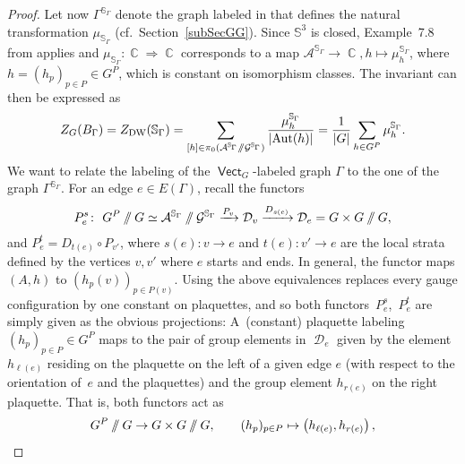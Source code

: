\documentclass[pdftex]{sigma}
\DeclareMathOperator{\Aut}{Aut}
\DeclareMathOperator{\vect}{\mathsf{Vect}}
\DeclareMathOperator{\C}{\mathbb{C}}
\DeclareMathOperator{\cald}{\mathcal{D}}
\newcommand{\sslash}{\mathbin{/\mkern-6mu/}}
\numberwithin{equation}{section}
\theoremstyle{definition}
\begin{document}
\begin{proof}
Let now $\Gamma^{\mathbb{S}_{\Gamma}}$ denote the graph labeled in \smash{$\vect_{\C}^{\mathcal{A}^{\mathbb{S}_{\Gamma}} \sslash \mathcal{G}^{\mathbb{S}_{\Gamma}}}$} that defines the natural transformation $\mu_{\mathbb{S}_{\Gamma}}$ (cf.\ Section~\ref{subSecGG}). Since $\mathbb{S}^3$ is closed, Example~7.8 from \cite{FMM} applies and $\mu_{\mathbb{S}_{\Gamma}}\colon \C \Rightarrow \C$ corresponds to a map $\mathcal{A}^{\mathbb{S}_{\Gamma}} \rightarrow \C, h \mapsto \mu_h^{\mathbb{S}_{\Gamma}}$, where $h = (h_p)_{p \in P} \in G^{P}$, which is constant on isomorphism classes. The invariant can then be expressed as
\begin{align}
 \label{eqBallInv}
 Z_G(B_{\Gamma}) = Z_{\rm DW}(\mathbb{S}_{\Gamma}) = \sum_{[h] \in \pi_0(\mathcal{A}^{\mathbb{S}_{\Gamma}} \sslash \mathcal{G}^{\mathbb{S}_{\Gamma}})}\frac{\mu_h^{\mathbb{S}_{\Gamma}}}{|{\Aut(h)}|} = \frac{1}{|G|}\sum_{h \in G^P} \mu_h^{\mathbb{S}_{\Gamma}}.
\end{align}
We want to relate the labeling of the $\vect_{G}$-labeled graph $\Gamma$ to the one of the graph $\Gamma^{\mathbb{S}_{\Gamma}}$. For an edge $e \in E(\Gamma)$, recall the functors
\begin{align*}
 P_e^s \colon \ G^P\sslash G \simeq \mathcal{A}^{\mathbb{S}_{\Gamma}} \sslash \mathcal{G}^{\mathbb{S}_{\Gamma}} \xrightarrow{P_v} \mathcal{D}_v \xrightarrow{D_{s(e)}} \mathcal{D}_e = G \times G \sslash G,
\end{align*}
and $P_e^t = D_{t(e)} \circ P_{v'}$, where $s(e)\colon v \rightarrow e$ and $t(e)\colon v' \rightarrow e$ are the local strata defined by the vertices $v, v'$ where $e$ starts and ends. In general, the functor \smash{$P_v\colon \mathcal{A}^{\mathbb{S}_{\Gamma}} \sslash \mathcal{G}^{\mathbb{S}_{\Gamma}} \rightarrow \cald_v$} maps $(A, h)$ to $(h_p(v))_{p \in P(v)}$. Using the above equivalences replaces every gauge configuration by one constant on plaquettes, and so both functors~$P_e^s$,~$P_e^t$ are simply given as the obvious projections: A~(constant) plaquette labeling $(h_p)_{p \in P} \in G^P$ maps to the pair of group elements in $\cald_e$ given by the element $h_{\ell(e)}$ residing on the plaquette on the left of a given edge $e$ (with respect to the orientation of~$e$ and the plaquettes) and the group element $h_{r(e)}$ on the right plaquette. That is, both functors act as
\begin{align*}
 G^P \sslash G \rightarrow G \times G \sslash G, \qquad (h_p)_{p \in P} \mapsto \left(h_{\ell(e)}, h_{r(e)}\right),
\end{align*}

\end{proof}
\end{document}
